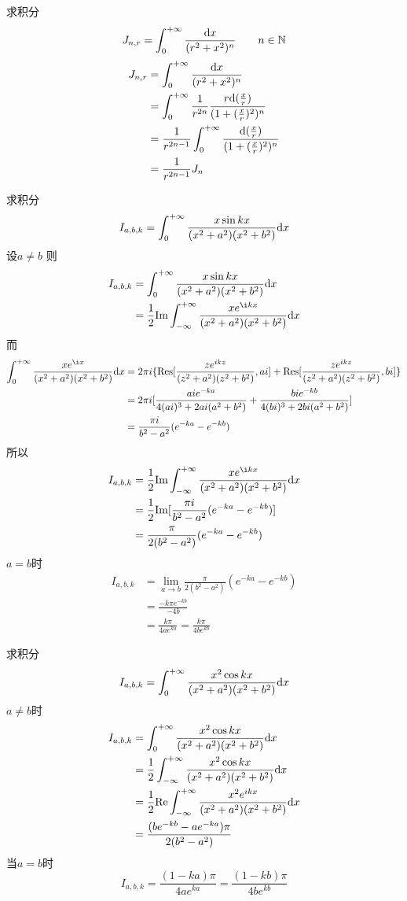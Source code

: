 \begin{homeworkProblem}
    求积分
    \[
    J_{n,r} = \int_0^{+\infty}\frac{\mathrm{d}x}{(r^2+x^2)^n} \qquad n\in\mathbb{N}
    \]
\solution
\[\begin{split}
J_{n,r} &= \int_0^{+\infty}\frac{\mathrm{d}x}{(r^2+x^2)^n}\\
&= \int_0^{+\infty} \frac{1}{r^{2n}}\frac{r\mathrm{d}(\frac{x}{r})}{(1+(\frac{x}{r})^2)^n}\\
&= \frac{1}{r^{2n-1}}\int_0^{+\infty}\frac{\mathrm{d}(\frac{x}{r})}{(1+(\frac{x}{r})^2)^n}\\
&= \frac{1}{r^{2n-1}}J_n
\end{split}\]
\end{homeworkProblem}
\begin{homeworkProblem}
    求积分
    \[
    I_{a,b,k} = \int_0^{+\infty}\frac{x\sin kx}{(x^2+a^2)(x^2+b^2)}\mathrm{d}x
    \]
\solution
设$a\neq b$
则
\[\begin{split}
I_{a,b,k} &= \int_0^{+\infty}\frac{x\sin kx}{(x^2+a^2)(x^2+b^2)}\dx\\
&= \frac{1}{2}\mathrm{Im}\int_{-\infty}^{+\infty}\frac{xe^{\i kx}}{(x^2+a^2)(x^2+b^2)}\dx
\end{split}\]
而
\[\begin{split}
\int_0^{+\infty}\frac{xe^{\i x}}{(x^2+a^2)(x^2+b^2)}\dx
&= 2\pi i\{\Res[\frac{ze^{ikz}}{(z^2+a^2)(z^2+b^2)}, ai] + \Res[\frac{ze^{ikz}}{(z^2+a^2)(z^2+b^2)}, bi]\}\\
&= 2\pi i [\frac{aie^{-ka}}{4(ai)^3+2ai(a^2+b^2)} + \frac{bie^{-kb}}{4(bi)^3+2bi(a^2+b^2)}]\\
&= \frac{\pi i}{b^2-a^2}(e^{-ka}-e^{-kb})
\end{split}\]
所以
\[\begin{split}
I_{a,b,k}
&= \frac{1}{2}\mathrm{Im}\int_{-\infty}^{+\infty}\frac{xe^{\i kx}}{(x^2+a^2)(x^2+b^2)}\dx\\
&= \frac{1}{2}\mathrm{Im}[\frac{\pi i}{b^2-a^2}(e^{-ka}-e^{-kb})]\\
&= \frac{\pi}{2(b^2-a^2)}(e^{-ka}-e^{-kb})
\end{split}\]
$a=b$时
\[\begin{split}
I_{a,b,k}
&= \lim_{a\rightarrow b}\frac{\pi}{2(b^2-a^2)}(e^{-ka}-e^{-kb}) \\
&= \frac{-k\pi e^{-kb}}{-4b} \\
&= \frac{k\pi}{4ae^{ka}} = \frac{k\pi}{4be^{kb}}
\end{split}\]
\end{homeworkProblem}
\begin{homeworkProblem}
    求积分
    \[
    I_{a,b,k} = \int_0^{+\infty}\frac{x^2\cos kx}{(x^2+a^2)(x^2+b^2)}\mathrm{d}x
    \]
\solution
$a\neq b$时
\[\begin{split}
I_{a,b,k} &= \int_0^{+\infty}\frac{x^2\cos kx}{(x^2+a^2)(x^2+b^2)}\mathrm{d}x\\
&= \frac{1}{2}\int_{-\infty}^{+\infty}\frac{x^2\cos kx}{(x^2+a^2)(x^2+b^2)}\mathrm{d}x\\
&= \frac{1}{2}\mathrm{Re}\int_{-\infty}^{+\infty}\frac{x^2e^{ikx}}{(x^2+a^2)(x^2+b^2)}\mathrm{d}x\\
&= \frac{(be^{-kb}-ae^{-ka})\pi}{2(b^2-a^2)}
\end{split}\]
当$a=b$时
\[I_{a,b,k} = \frac{(1-ka)\pi}{4ae^{ka}}= \frac{(1-kb)\pi}{4be^{kb}}\]
\end{homeworkProblem}
\newpage
